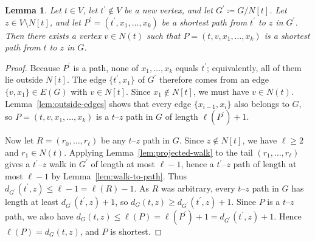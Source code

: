 \documentclass[11pt,a4paper]{amsart}
\theoremstyle{definition}
\theoremstyle{plain}
\newtheorem{lemma}[definition]{Lemma}
\newcommand{\len}[1]{\ell(#1)}
\newcommand{\dist}[3]{d_{#1}(#2,#3)}
\begin{document}
\begin{lemma}\label{lem:lifting-endpoint}
Let $t\in V$, let $t^\prime\notin V$ be a new vertex, and let $G^\prime\coloneqq G/N[t]$. Let $z\in V\setminus N[t]$, and let $P^\prime=(t^\prime,x_1,\dots,x_k)$ be a shortest path from $t^\prime$ to $z$ in $G^\prime$. Then there exists a vertex $v\in N(t)$ such that $P=(t,v,x_1,\dots,x_k)$ is a shortest path from $t$ to $z$ in $G$.
\end{lemma}

\begin{proof}
Because $P^\prime$ is a path, none of $x_1,\dots,x_k$ equals $t^\prime$; equivalently, all of them lie outside $N[t]$. The edge $\{t^\prime,x_1\}$ of $G^\prime$ therefore comes from an edge $\{v,x_1\}\in E(G)$ with $v\in N[t]$. Since $x_1\notin N[t]$, we must have $v\in N(t)$. Lemma~\ref{lem:outside-edges} shows that every edge $\{x_{i-1},x_i\}$ also belongs to $G$, so $P=(t,v,x_1,\dots,x_k)$ is a $t$--$z$ path in $G$ of length $\len{P^\prime}+1$.

Now let $R=(r_0,\dots,r_\ell)$ be any $t$--$z$ path in $G$. Since $z\notin N[t]$, we have $\ell\ge 2$ and $r_1\in N(t)$. Applying Lemma~\ref{lem:projected-walk} to the tail $(r_1,\dots,r_\ell)$ gives a $t^\prime$--$z$ walk in $G^\prime$ of length at most $\ell-1$, hence a $t^\prime$--$z$ path of length at most $\ell-1$ by Lemma~\ref{lem:walk-to-path}. Thus $\dist{G^\prime}{t^\prime}{z}\le \ell-1=\len{R}-1$. As $R$ was arbitrary, every $t$--$z$ path in $G$ has length at least $\dist{G^\prime}{t^\prime}{z}+1$, so $\dist{G}{t}{z}\ge \dist{G^\prime}{t^\prime}{z}+1$. Since $P$ is a $t$--$z$ path, we also have $\dist{G}{t}{z}\le \len{P}=\len{P^\prime}+1=\dist{G^\prime}{t^\prime}{z}+1$.
Hence $\len{P}=\dist{G}{t}{z}$, and $P$ is shortest.
\end{proof}
\end{document}
